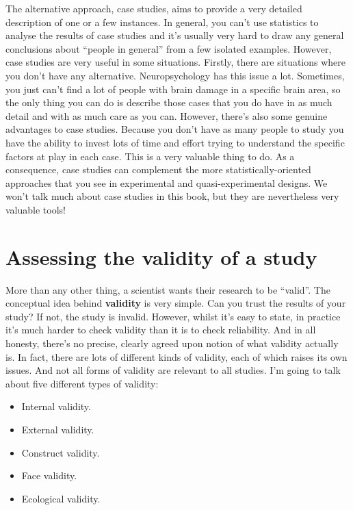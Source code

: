 \documentclass[
  a4paper,
]{book}
\providecommand{\tightlist}{%
  \setlength{\itemsep}{0pt}\setlength{\parskip}{0pt}}\usepackage{longtable,booktabs,array}
\begin{document}
The alternative approach, case studies, aims to provide a very detailed
description of one or a few instances. In general, you can't use
statistics to analyse the results of case studies and it's usually very
hard to draw any general conclusions about ``people in general'' from a
few isolated examples. However, case studies are very useful in some
situations. Firstly, there are situations where you don't have any
alternative. Neuropsychology has this issue a lot. Sometimes, you just
can't find a lot of people with brain damage in a specific brain area,
so the only thing you can do is describe those cases that you do have in
as much detail and with as much care as you can. However, there's also
some genuine advantages to case studies. Because you don't have as many
people to study you have the ability to invest lots of time and effort
trying to understand the specific factors at play in each case. This is
a very valuable thing to do. As a consequence, case studies can
complement the more statistically-oriented approaches that you see in
experimental and quasi-experimental designs. We won't talk much about
case studies in this book, but they are nevertheless very valuable
tools!

\hypertarget{assessing-the-validity-of-a-study}{%
\section{Assessing the validity of a
study}\label{assessing-the-validity-of-a-study}}

More than any other thing, a scientist wants their research to be
``valid''. The conceptual idea behind \textbf{validity} is very simple.
Can you trust the results of your study? If not, the study is invalid.
However, whilst it's easy to state, in practice it's much harder to
check validity than it is to check reliability. And in all honesty,
there's no precise, clearly agreed upon notion of what validity actually
is. In fact, there are lots of different kinds of validity, each of
which raises its own issues. And not all forms of validity are relevant
to all studies. I'm going to talk about five different types of
validity:

\begin{itemize}
\tightlist
\item
  Internal validity.
\item
  External validity.
\item
  Construct validity.
\item
  Face validity.
\item
  Ecological validity.
\end{itemize}
\end{document}
